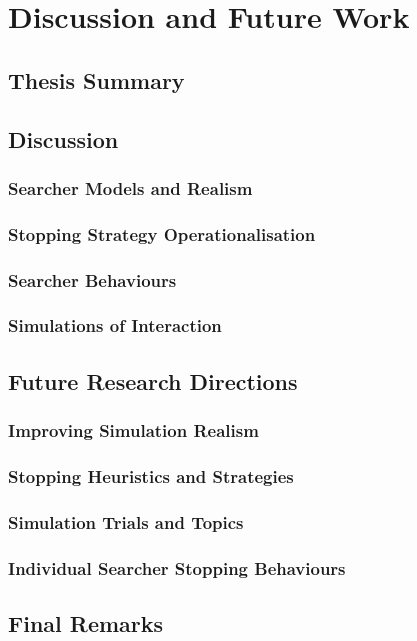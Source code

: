 
\chapter[Discussion and Future Work]{Discussion and Future Work}\label{chap:conclusions}

\section{Thesis Summary}\label{sec:conclusions:summary}

\section{Discussion}\label{sec:conclusions:discussion}

\subsection{Searcher Models and Realism}

\subsection{Stopping Strategy Operationalisation}

\subsection{Searcher Behaviours}

\subsection{Simulations of Interaction}

\section{Future Research Directions}\label{sec:conclusions:future}

\subsection{Improving Simulation Realism}\label{sec:conclusions:future:improving}

\subsection{Stopping Heuristics and Strategies}\label{sec:conclusions:future:stopping}

\subsection{Simulation Trials and Topics}\label{sec:conclusions:future:running}

\subsection{Individual Searcher Stopping Behaviours}

\section{Final Remarks}\label{sec:conclusions:remarks}